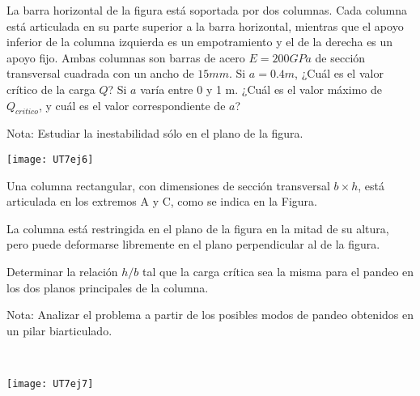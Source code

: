 %
%	
%	





\ejercicio

La barra horizontal de la figura está soportada por dos columnas. Cada columna está articulada en su parte superior a la barra horizontal, mientras que el apoyo inferior de la columna izquierda es un empotramiento y el de la derecha es un apoyo fijo. Ambas columnas son barras de acero $E=200GPa$ de sección transversal cuadrada con un ancho de $15 mm$.
\parte Si $a=0.4m$, ¿Cuál es el valor crítico de la carga $Q$?
\parte Si $a$ varía entre 0 y 1 m. ¿Cuál es el valor máximo de $Q_{critico}$, y cuál es el valor correspondiente de $a$?

Nota: Estudiar la inestabilidad sólo en el plano de la figura.

\begin{center}
	\texttt{[image: UT7ej6]}
\end{center}





\ejercicio

\begin{minipage}[b]{0.6\textwidth}
	
	Una columna rectangular, con dimensiones de sección transversal $b \times h$, está articulada en los extremos A y C, como se indica en la Figura.
	
	La columna está restringida en el plano de la figura en la mitad de su altura, pero puede deformarse libremente en el plano perpendicular al de la figura.
	
	Determinar la relación $h/b$ tal que la carga crítica sea la misma para el pandeo en los dos planos principales de la columna.
	
	Nota: Analizar el problema a partir de los posibles modos de pandeo obtenidos en un pilar biarticulado.
	
\end{minipage}
~
\begin{minipage}[b]{0.4\textwidth}
	\begin{center}
		\texttt{[image: UT7ej7]}
	\end{center}
\end{minipage}





